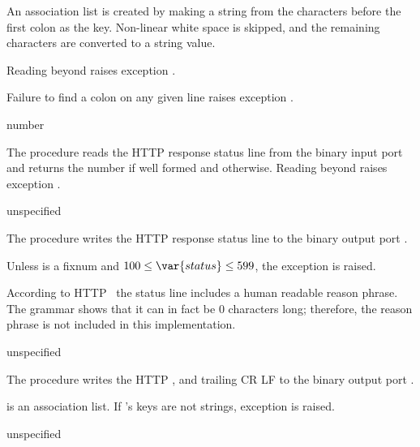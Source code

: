 An association list is created by making a string from the characters
before the first colon as the key. Non-linear white space is skipped,
and the remaining characters are converted to a string value.

Reading beyond  raises exception
.

Failure to find a colon on any given line raises exception
.

\begin{procedure}
\end{procedure}
\returns{} number \alt{} 

The  procedure reads the HTTP response status
line from the binary input port  and returns the number if
well formed and  otherwise. Reading beyond 
raises exception .

\begin{procedure}
\end{procedure}
\returns{} unspecified

The  procedure writes the HTTP response
status line to the binary output port .

Unless  is a fixnum and $100 \leq \var{status} \leq 599$, the
exception  is
raised.

According to HTTP~\cite{RFC7230} the status line includes a human
readable reason phrase. The grammar shows that it can in fact be 0
characters long; therefore, the reason phrase is not included in this
implementation.

\begin{procedure}
\end{procedure}
\returns{} unspecified

The  procedure writes the HTTP ,
and trailing CR LF to the binary output port .

 is an association list. If 's keys are not
strings, exception 
is raised.

\begin{procedure}
\end{procedure}
\returns{} unspecified

